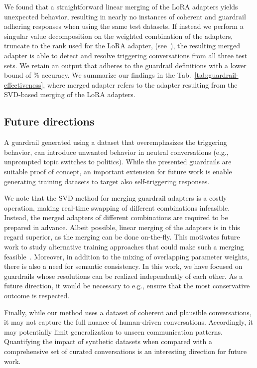 \documentclass[letterpaper]{article}
\begin{document}
We found that a straightforward linear merging of the LoRA adapters yields unexpected behavior, resulting in nearly no instances of coherent and guardrail adhering responses when using the same test datasets. 
If instead we perform a singular value decomposition on the weighted combination of the adapters, truncate to the rank used for the LoRA adapter,
(see~\cite{code}), the resulting merged adapter is able to detect and resolve triggering conversations from all three test sets. 
We retain an output that adheres to the guardrail definitions with a lower bound of \minGuardrailMergedEfficiency\% accuracy. We summarize our findings in the Tab.~\ref{tab:guardrail-effectiveness}, where merged adapter refers to the adapter resulting from the SVD-based merging of the LoRA adapters.


\subsection{Future directions}
A guardrail generated using a dataset that overemphasizes the triggering behavior, can introduce unwanted behavior in neutral conversations  (e.g., unprompted topic switches to politics). While the presented guardrails are suitable proof of concept, an important extension for future work is enable generating training datasets to target also self-triggering responses. 

We note that the SVD method for merging guardrail adapters is a costly operation, making real-time swapping of different combinations infeasible.  Instead, the merged adapters of different combinations are required to be prepared in advance. Albeit possible, linear merging of the adapters is in this regard superior, as the merging can be done on-the-fly. This motivates future work to study alternative training approaches that could make such a merging feasible~\cite{hu2024learn}. Moreover, in addition to the mixing of overlapping parameter weights, there is also a need for semantic consistency. In this work, we have focused on guardrails whose resolutions can be realized independently of each other. As a future direction, it would be necessary to e.g., ensure that the most conservative outcome is respected. 

Finally, while our method uses a dataset of coherent and plausible conversations, it may not capture the full nuance of human-driven conversations. Accordingly, it may potentially limit generalization to unseen communication patterns. 
Quantifying the impact of synthetic datasets when compared with a comprehensive set of curated conversations is an interesting direction for future work. 
\end{document}
